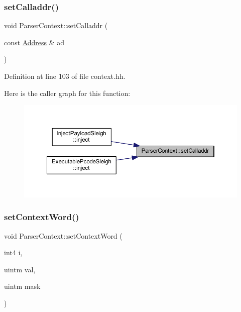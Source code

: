 \subsubsection{\texorpdfstring{setCalladdr()}{setCalladdr()}}
{\footnotesize\ttfamily void Parser\+Context\+::set\+Calladdr (\begin{DoxyParamCaption}\item[{const \mbox{\hyperlink{class_address}{Address}} \&}]{ad }\end{DoxyParamCaption})\hspace{0.3cm}{\ttfamily [inline]}}



Definition at line 103 of file context.\+hh.

Here is the caller graph for this function\+:
\nopagebreak
\begin{figure}[H]
\begin{center}
\leavevmode
\includegraphics[width=350pt]{class_parser_context_a804dc3663f33ae4a4ffb7278e7225546_icgraph}
\end{center}
\end{figure}
\mbox{\label{class_parser_context_a1242790851c096298227efeab13a2df0}} 
\subsubsection{\texorpdfstring{setContextWord()}{setContextWord()}}
{\footnotesize\ttfamily void Parser\+Context\+::set\+Context\+Word (\begin{DoxyParamCaption}\item[{int4}]{i,  }\item[{uintm}]{val,  }\item[{uintm}]{mask }\end{DoxyParamCaption})\hspace{0.3cm}{\ttfamily [inline]}}



